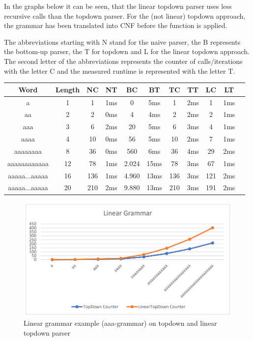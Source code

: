 \documentclass[a4paper, 11pt]{article}
\begin{document}
In the graphs below it can be seen, that the linear topdown parser uses less recursive calls than the topdown parser. For the (not linear) topdown approach, the grammar has been translated into CNF before the function is applied.

The abbreviations starting with N stand for the naive parser, the B represents the bottom-up parser, the T for topdown and L for the linear topdown approach. The second letter of the abbreviations represents the counter of calls/iterations with the letter C and the measured runtime is represented with the letter T.

\begin{center}
\begin{tabular}{|c|c||c|c||c|c||c|c||c|c|c|}
\hline
Word & Length & NC & NT & BC & BT & TC & TT & LC & LT \\
\hline
\hline
a & 1 & 1 & 1ms & 0 & 5ms & 1 & 2ms & 1 & 1ms \\
\hline
aa & 2 & 2 & 0ms & 4 & 4ms & 2 & 2ms & 2 & 1ms \\
\hline
aaa & 3 & 6 & 2ms & 20 & 5ms & 6 & 3ms & 4 & 1ms \\
\hline
aaaa & 4 & 10 & 0ms & 56 & 5ms & 10 & 2ms & 7 & 1ms \\
\hline
aaaaaaaa & 8 & 36 & 0ms & 560 & 6ms & 36 & 4ms & 29 & 2ms \\
\hline
aaaaaaaaaaaa & 12 & 78 & 1ms & 2.024 & 15ms & 78 & 3ms &  67 & 1ms \\
\hline
aaaaa...aaaaa & 16 & 136 & 1ms & 4.960 & 13ms & 136 & 3ms & 121 & 2ms \\
\hline
aaaaa...aaaaa & 20 & 210 & 2ms & 9.880 & 13ms & 210 & 3ms & 191 & 2ms \\
\hline
\end{tabular}
\end{center}

\begin{figure}[H]
\begin{center}
\includegraphics[scale=0.4]{diagrams/LGBTQ.png}
\end{center}
\caption{Linear grammar example (aaa-grammar) on topdown and linear topdown parser}
\end{figure}
\end{document}
